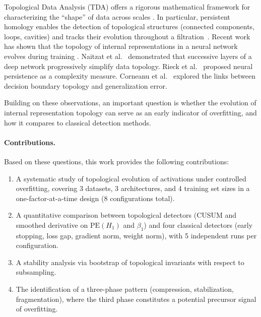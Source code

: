 \documentclass[11pt,a4paper]{article}
\newcommand{\betti}{\beta}
\newcommand{\PE}{\mathrm{PE}}
\begin{document}
Topological Data Analysis (TDA) offers a rigorous mathematical framework
for characterizing the ``shape'' of data across scales
\cite{Carlsson2009TopologyAD, chazal2021introductiontopologicaldataanalysis}. In particular,
persistent homology enables the detection of topological structures
(connected components, loops, cavities) and tracks their evolution
throughout a filtration~\cite{Edelsbrunner2002, Ghrist2007BarcodesTP}.
Recent work has shown that the topology of internal representations in
a neural network evolves during training
\cite{naitzat2020topologydeepneuralnetworks, rieck2019neural, guss2018characterizingcapacityneuralnetworks}.
Naitzat et al.~\cite{naitzat2020topologydeepneuralnetworks} demonstrated that successive
layers of a deep network progressively simplify data topology. Rieck
et al.~\cite{rieck2019neural} proposed neural persistence as a
complexity measure. Corneanu et al.~\cite{corneanu2020computingtestingerrortesting} explored
the links between decision boundary topology and generalization error.

Building on these observations, an important question is whether the evolution of internal representation topology can serve as an early indicator of overfitting, and how it compares to classical detection methods.

\paragraph{Contributions.} Based on these questions, this work provides the following contributions:
\begin{enumerate}
  \item A systematic study of topological evolution of activations under
  controlled overfitting, covering 3 datasets, 3 architectures,
  and 4 training set sizes in a one-factor-at-a-time design
  (8 configurations total).

  \item A quantitative comparison between topological detectors
  (CUSUM and smoothed derivative on $\PE(H_1)$ and $\betti_1$) and four
  classical detectors (early stopping, loss gap, gradient norm, weight norm),
  with 5 independent runs per configuration.

  \item A stability analysis via bootstrap of topological invariants
  with respect to subsampling.

  \item The identification of a three-phase pattern (compression, stabilization,
  fragmentation), where the third phase constitutes a potential precursor
  signal of overfitting.
\end{enumerate}
\end{document}
